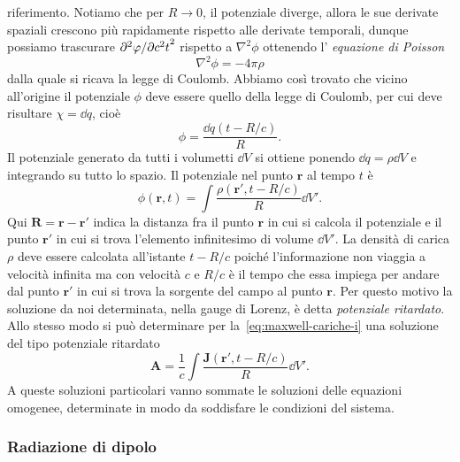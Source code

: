 riferimento.  Notiamo che per $R \to 0$, il potenziale diverge, allora le sue
derivate spaziali crescono più rapidamente rispetto alle derivate temporali,
dunque possiamo trascurare $\lparder[2]{\phi}{c^{2}t}$ rispetto a
$\nabla^{2} \phi$ ottenendo l'
\emph{equazione di Poisson}
\begin{equation}
  \nabla^{2} \phi = -4\pi\rho
\end{equation}
dalla quale si ricava la legge di Coulomb.  Abbiamo così trovato che vicino
all'origine il potenziale $\phi$ deve essere quello della legge di Coulomb, per
cui deve risultare $\chi = \dd q$, cioè
\begin{equation}
  \phi = \frac{\dd q(t - R/c)}{R}.
\end{equation}
Il potenziale generato da tutti i volumetti $\dd V$ si ottiene ponendo
$\dd q = \rho\dd V$ e integrando su tutto lo spazio.  Il potenziale nel punto
$\bm{r}$ al tempo $t$ è
\begin{equation}
  \label{eq:potenz-rit-phi}
  \phi(\bm{r}, t) = \int \frac{\rho(\bm{r}', t - R/c)}{R} \dd V'.
\end{equation}
Qui $\bm{R} = \bm{r} - \bm{r}'$ indica la distanza fra il punto $\bm{r}$ in cui
si calcola il potenziale e il punto $\bm{r}'$ in cui si trova l'elemento
infinitesimo di volume $\dd V'$.  La densità di carica $\rho$ deve essere
calcolata all'istante $t - R/c$ poiché l'informazione non viaggia a velocità
infinita ma con velocità $c$ e $R/c$ è il tempo che essa impiega per andare dal
punto $\bm{r}'$ in cui si trova la sorgente del campo al punto $\bm{r}$.  Per
questo motivo la soluzione da noi determinata, nella gauge di Lorenz, è detta
\emph{potenziale ritardato}.  Allo stesso modo si
può determinare per la~\eqref{eq:maxwell-cariche-i} una soluzione del tipo
potenziale ritardato
\begin{equation}
  \label{eq:potenz-rit-A}
  \bm{A} = \frac{1}{c} \int \frac{\bm{J}(\bm{r}',t - R/c )}{R} \dd V'.
\end{equation}
A queste soluzioni particolari vanno sommate le soluzioni delle equazioni
omogenee, determinate in modo da soddisfare le condizioni del sistema.

\subsubsection{Radiazione di dipolo}
\label{sec:radiazione-dipolo}

